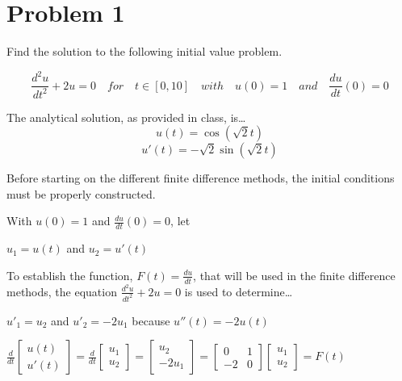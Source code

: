 \documentclass[12pt,letterpaper]{article}
\begin{document}
\section*{Problem 1}
Find the solution to the following initial value problem.

\begin{equation}
\frac{d^2u}{dt^2}+2u= 0 \quad  for \quad t \in [0,10]
\quad with \quad u(0) = 1 \quad and \quad \frac{du}{dt}(0) = 0
\end{equation}

The analytical solution, as provided in class, is\ldots
\begin{equation}
    u(t)= \cos(\sqrt{2}t)
\end{equation}
\begin{equation}
    u'(t)= -\sqrt{2}\sin(\sqrt{2}t)
\end{equation}


Before starting on the different finite difference methods, the initial conditions must be properly constructed.

With $u(0) = 1$ and $\frac{du}{dt}(0) = 0$, let

\begin{center} 
    $u_{1}=u(t)$ and $u_{2}=u'(t)$
\end{center}

To establish the function, $F(t)=\frac{du}{dt}$, that will be used in the finite difference methods, the equation $\frac{d^2u}{dt^2}+2u= 0$ is used to determine\ldots
\begin{center} 
    $u'_{1}=u_{2}$ and $u'_{2}=-2u_{1}$ because $u''(t)=-2u(t)$
\end{center}
\begin{center} 
    $\frac{d}{dt}\begin{bmatrix} u(t) \\ u'(t) \end{bmatrix} = \frac{d}{dt}\begin{bmatrix} u_{1} \\ u_{2} \end{bmatrix} = \begin{bmatrix} u_{2} \\ -2u_{1} \end{bmatrix} = \begin{bmatrix} 0&1 \\ -2&0 \end{bmatrix}\begin{bmatrix} u_{1} \\ u_{2} \end{bmatrix}=F(t)$
\end{center}
\end{document}
